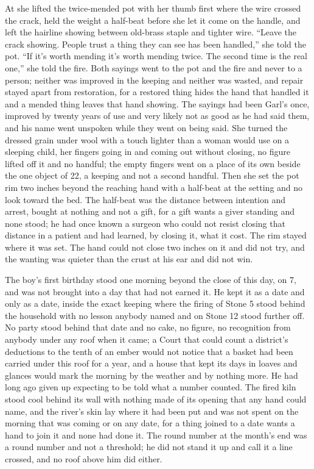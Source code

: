 At  she lifted the twice-mended pot with her thumb first where the wire crossed the crack, held the weight a half-beat before she let it come on the handle, and left the hairline showing between old-brass staple and tighter wire. “Leave the crack showing. People trust a thing they can see has been handled,” she told the pot. “If it's worth mending it's worth mending twice. The second time is the real one,” she told the fire. Both sayings went to the pot and the fire and never to a person; neither was improved in the keeping and neither was wasted, and repair stayed apart from restoration, for a restored thing hides the hand that handled it and a mended thing leaves that hand showing. The sayings had been Garl's once, improved by twenty years of use and very likely not as good as he had said them, and his name went unspoken while they went on being said. She turned the dressed grain under wool with a touch lighter than a woman would use on a sleeping child, her fingers going in and coming out without closing, no figure lifted off it and no handful; the empty fingers went on a place of its own beside the one object of  22, a keeping and not a second handful. Then she set the pot rim two inches beyond the reaching hand with a half-beat at the setting and no look toward the bed. The half-beat was the distance between intention and arrest, bought at nothing and not a gift, for a gift wants a giver standing and none stood; he had once known a surgeon who could not resist closing that distance in a patient and had learned, by closing it, what it cost. The rim stayed where it was set. The hand could not close two inches on it and did not try, and the wanting was quieter than the crust at his ear and did not win.

The boy's first birthday stood one morning beyond the close of this day, on  7, and was not brought into a day that had not earned it. He kept it as a date and only as a date, inside the exact keeping where the firing of Stone 5 stood behind the household with no lesson anybody named and  on Stone 12 stood further off. No party stood behind that date and no cake, no figure, no recognition from anybody under any roof when it came; a Court that could count a district's deductions to the tenth of an ember would not notice that a basket had been carried under this roof for a year, and a house that kept its days in loaves and glances would mark the morning by the weather and by nothing more. He had long ago given up expecting to be told what a number counted. The fired kiln stood cool behind its wall with nothing made of its opening that any hand could name, and the river's skin lay where it had been put and was not spent on the morning that was coming or on any date, for a thing joined to a date wants a hand to join it and none had done it. The round number at the month's end was a round number and not a threshold; he did not stand it up and call it a line crossed, and no roof above him did either.

